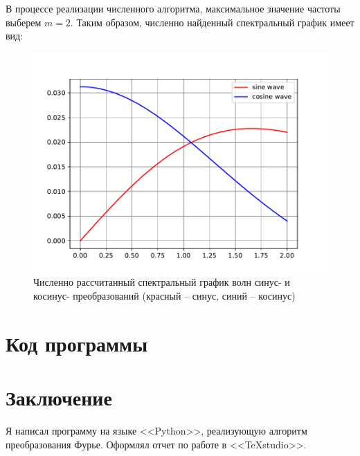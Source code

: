 \documentclass[a4paper, 14pt]{extarticle}
\begin{document}
		В процессе реализации численного алгоритма, максимальное значение частоты выберем \(m = 2\). Таким образом, численно найденный спектральный график имеет вид:
		\begin{figure}[H]
			\centering
			\includegraphics[width = .75\linewidth]{plot2.pdf}
			\caption[.] {Численно рассчитанный спектральный график волн синус- и косинус- преобразований (красный -- синус, синий -- косинус)}
		\end{figure}
	
	\section{Код программы}
		
		
	\section{Заключение}
		\noindent Я написал программу на языке <<Python>>, реализующую алгоритм преобразования Фурье. Оформлял отчет по работе  в <<\TeX studio>>.
\end{document}

